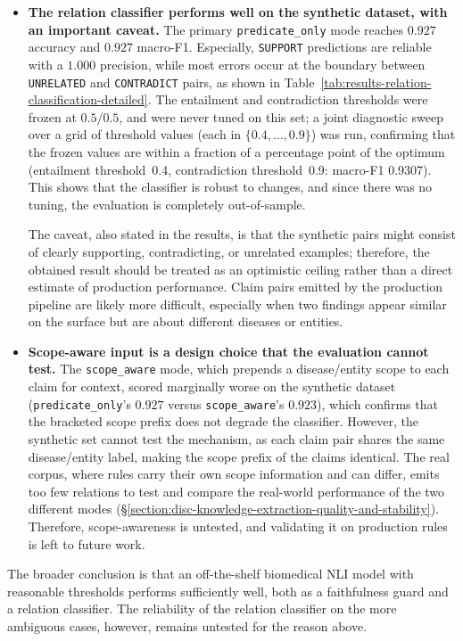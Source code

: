 \begin{itemize}[label={},leftmargin=1.5em]

    \item \textbf{The relation classifier performs well on the synthetic dataset, with an important caveat.} The primary \texttt{predicate\_only} mode reaches $0.927$ accuracy and $0.927$ macro-F1. Especially, \texttt{SUPPORT} predictions are reliable with a $1.000$ precision, while most errors occur at the boundary between \texttt{UNRELATED} and \texttt{CONTRADICT} pairs, as shown in Table~\ref{tab:results-relation-classification-detailed}. The entailment and contradiction thresholds were frozen at $0.5/0.5$, and were never tuned on this set; a joint diagnostic sweep over a grid of threshold values (each in $\{0.4, \dots, 0.9\}$) was run, confirming that the frozen values are within a fraction of a percentage point of the optimum (entailment threshold~0.4,
    contradiction threshold~0.9: macro-F1 0.9307). This shows that the classifier is robust to changes, and since there was no tuning, the evaluation is completely out-of-sample. 
    
    The caveat, also stated in the results, is that the synthetic pairs might consist of clearly supporting, contradicting, or unrelated examples; therefore, the obtained result should be treated as an optimistic ceiling rather than a direct estimate of production performance. Claim pairs emitted by the production pipeline are likely more difficult, especially when two findings appear similar on the surface but are about different diseases or entities. 
    
    \item \textbf{Scope-aware input is a design choice that the evaluation cannot test.} The \texttt{scope\_aware} mode, which prepends a disease/entity scope to each claim for context, scored marginally worse on the synthetic dataset (\texttt{predicate\_only}'s $0.927$ versus \texttt{scope\_aware}'s $0.923$), which confirms that the bracketed scope prefix does not degrade the classifier. However, the synthetic set cannot test the mechanism, as each claim pair shares the same disease/entity label, making the scope prefix of the claims identical. The real corpus, where rules carry their own scope information and can differ, emits too few relations to test and compare the real-world performance of the two different modes (§\ref{section:disc-knowledge-extraction-quality-and-stability}). Therefore, scope-awareness is untested, and validating it on production rules is left to future work.

\end{itemize}
    
The broader conclusion is that an off-the-shelf biomedical NLI model with reasonable thresholds performs sufficiently well, both as a faithfulness guard and a relation classifier. The reliability of the relation classifier on the more ambiguous cases, however, remains untested for the reason above.